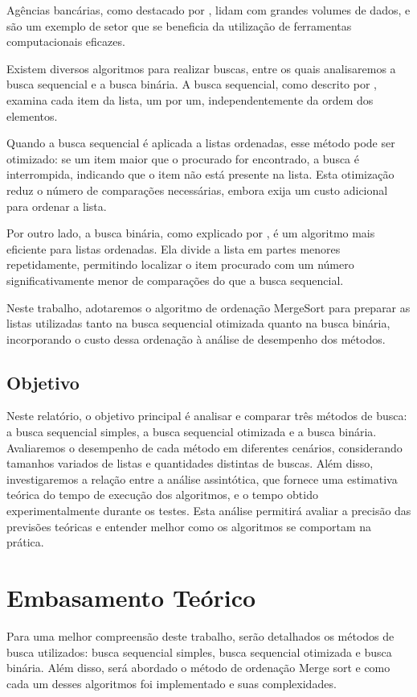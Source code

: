 \documentclass[12pt]{article}
\begin{document}
    Agências bancárias, como destacado por \cite{alves:2018}, lidam com grandes volumes de dados, e são um exemplo de setor que se beneficia da utilização de ferramentas computacionais eficazes.

    Existem diversos algoritmos para realizar buscas, entre os quais analisaremos a busca sequencial e a busca binária. A busca sequencial, como descrito por \cite{geeks:2024_linear}, examina cada item da lista, um por um, independentemente da ordem dos elementos.

    Quando a busca sequencial é aplicada a listas ordenadas, esse método pode ser otimizado: se um item maior que o procurado for encontrado, a busca é interrompida, indicando que o item não está presente na lista. Esta otimização reduz o número de comparações necessárias, embora exija um custo adicional para ordenar a lista.

    Por outro lado, a busca binária,  como explicado por \cite{geeks:2024_binary}, é um algoritmo mais eficiente para listas ordenadas. Ela divide a lista em partes menores repetidamente, permitindo localizar o item procurado com um número significativamente menor de comparações do que a busca sequencial.

    Neste trabalho, adotaremos o algoritmo de ordenação MergeSort para preparar as listas utilizadas tanto na busca sequencial otimizada quanto na busca binária, incorporando o custo dessa ordenação à análise de desempenho dos métodos.


    

\subsection{Objetivo}
    Neste relatório, o objetivo principal é analisar e comparar três métodos de busca: a busca sequencial simples, a busca sequencial otimizada e a busca binária. Avaliaremos o desempenho de cada método em diferentes cenários, considerando tamanhos variados de listas e quantidades distintas de buscas. Além disso, investigaremos a relação entre a análise assintótica, que fornece uma estimativa teórica do tempo de execução dos algoritmos, e o tempo obtido experimentalmente durante os testes. Esta análise permitirá avaliar a precisão das previsões teóricas e entender melhor como os algoritmos se comportam na prática.








\section{Embasamento Teórico}
    Para uma melhor compreensão deste trabalho, serão detalhados os métodos de busca utilizados: busca sequencial simples, busca sequencial otimizada e busca binária. Além disso, será abordado o método de ordenação Merge sort e como cada um desses algoritmos foi implementado e suas complexidades.
\end{document}
